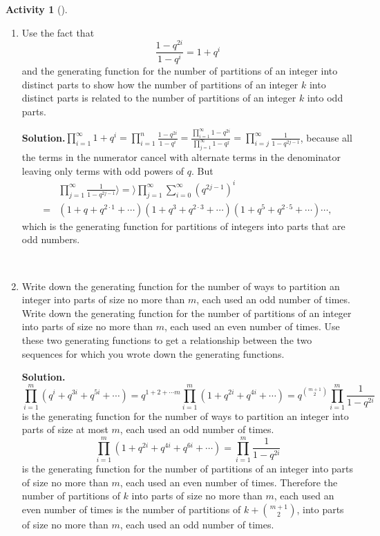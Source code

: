 \documentclass[10pt,]{book}
\theoremstyle{plain}
\theoremstyle{definition}
\newtheorem{activity}[project]{Activity}
\numberwithin{equation}{chapter}
\newcommand{\amp}{&}
\begin{document}
\begin{activity}[]\label{activity-196}
~\par
\begin{enumerate}[label=(\alph*)]
 \item Use the fact that%
\begin{equation*}
\frac{1-q^{2i}}{1-q^i}= 1+q^i
\end{equation*}
and the generating function for the number of partitions of an integer into distinct parts to show how the number of partitions of an integer \(k\) into distinct parts is related to the number of partitions of an integer \(k\) into odd parts.%
\par\medskip\noindent%
\textbf{Solution.}\quad \(\displaystyle\prod_{i=1}^\infty 1+q^i=\prod_{i=1}^n \frac{1-q^{2i}}{1-q^i}=\frac{\prod_{i=1}^\infty1-q^{2i}}{\prod_{j=1}^\infty 1-q^j}
=\prod_{i=j}^\infty \frac{1}{1-q^{2j-1}}\), because all the terms in the numerator cancel with alternate terms in the denominator leaving only terms with odd powers of \(q\). But%
\begin{align*}
\amp \prod_{j=1}^\infty\frac{1}{1-q^{2j-1}}\rangle =\rangle \prod_{j=1}^\infty
\sum_{i=0}^\infty
(q^{2j-1})^i\\
=\amp (1+q+q^{2\cdot1}+\cdots)(1+q^3+q^{2\cdot3}+\cdots)(1
+q^5+q^{2\cdot5}+\cdots)\cdots,
\end{align*}
which is the generating function for partitions of integers into parts that are odd numbers.%

~\par
\item Write down the generating function for the number of ways to partition an integer into parts of size no more than \(m\), each used an odd number of times. Write down the generating function for the number of partitions of an integer into parts of size no more than \(m\), each used an even number of times. Use these two generating functions to get a relationship between the two sequences for which you wrote down the generating functions.%
\par\medskip\noindent%
\textbf{Solution.}\quad %
\begin{equation*}
\displaystyle\prod_{i=1}^m (q^i+q^{3i}+q^{5i}+\cdots )= q^{1+2+\cdots
m}\prod_{i=1}^m (1+q^{2i}+q^{4i}+\cdots )=q^{\binom{m+1}{2}}\prod_{i=1}^m\frac{1}{1-q^{2i}}
\end{equation*}
is the generating function for the number of ways to partition an integer into parts of size at most \(m\), each used an odd number of times.%
\begin{equation*}
\displaystyle
\prod_{i=1}^m (1 +q^{2i}+q^{4i}+q^{6i}+\cdots )=\prod_{i=1}^m \frac{1}{1-q^{2i}}
\end{equation*}
is the generating function for the number of partitions of an integer into parts of size no more than \(m\), each used an even number of times. Therefore the number of partitions of \(k\) into parts of size no more than \(m\), each used an even number of times is the number of partitions of \(k+\binom{m+1}{2}\), into parts of size no more than \(m\), each used an odd number of times.%

\end{enumerate}
\end{activity}
\end{document}
